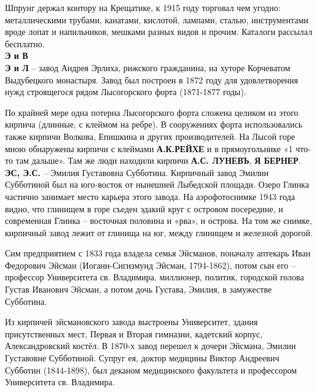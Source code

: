 Шпрунг держал контору на Крещатике, к 1915 году торговал чем угодно: металлическими трубами, канатами, кислотой, лампами, сталью, инструментами вроде лопат и напильников, мешками разных видов и прочим. Каталоги рассылал бесплатно.\\

\noindent\textbf{Э и В}\\

\noindent\textbf{Э и Л} – завод Андрея Эрлиха, рижского гражданина, на хуторе Корчеватом Выдубецкого монастыря. Завод был построен в 1872 году для удовлетворения нужд строящегося рядом Лысогорского форта (1871-1877 годы).

По крайней мере одна потерна Лысогорского форта сложена целиком из этого кирпича (длинные, с клеймом на ребре). В сооружениях форта использовались также кирпичи Волкова, Епишкина и других производителей. На Лысой горе мною обнаружены кирпичи с клеймами \textbf{А.К.РЕЙХЕ} и в прямоугольнике «1 что-то там дальше». Там же люди находили кирпичи \textbf{А.С. ЛУНЕВЪ}, \textbf{Я БЕРНЕР}.\\

\noindent\textbf{ЭС, Э.С.} – Эмилия Густавовна Субботина. Кирпичный завод Эмилии Субботиной был на юго-восток от нынешней Лыбедской площади. Озеро Глинка частично занимает место карьера этого завода. На аэрофотоснимке 1943 года видно, что глинищем в горе съеден эдакий круг с островом посередине, и современная Глинка – восточная половина и «рва», и острова. На том же снимке, кирпичный завод лежит от глинища на юг, между глинищем и железной дорогой.


Сим предприятием с 1833 года владела семья Эйсманов, поначалу аптекарь Иван Федорович Эйсман (Иоганн-Сигизмунд Эйсман, 1794-1862), потом сын его – профессор Университета св. Владимира, миллионер, политик, городской голова Густав Иванович Эйсман, а потом дочь Густава, Эмилия, в замужестве Субботина.

Из кирпичей эйсмановского завода выстроены Университет, здания присутственных мест, Первая и Вторая гимназии, кадетский корпус, Александровский костёл. В 1870-х завод перешел к дочери Эйсмана, Эмилии Густавовне Субботиной. Супруг ея, доктор медицины Виктор Андреевич Субботин (1844-1898), был деканом медицинского факультета и профессором Университета св. Владимира. 

